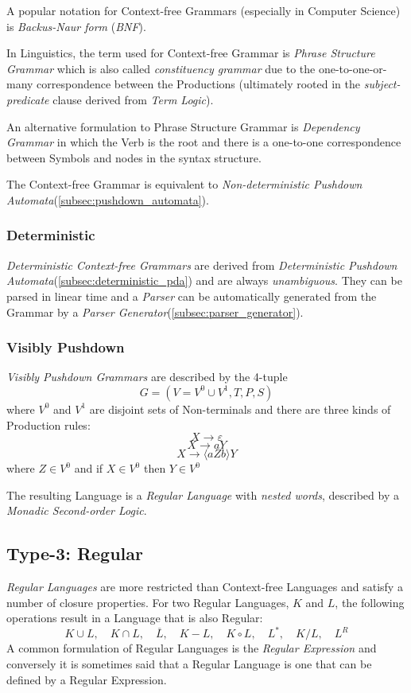 \documentclass{article}
\begin{document}
A popular notation for Context-free Grammars (especially in Computer
Science) is \emph{Backus-Naur form} (\emph{BNF}).

In Linguistics, the term used for Context-free Grammar is \emph{Phrase
  Structure Grammar} which is also called \emph{constituency grammar}
due to the one-to-one-or-many correspondence between the Productions
(ultimately rooted in the \emph{subject-predicate} clause derived from
\emph{Term Logic}).

An alternative formulation to Phrase Structure Grammar is \emph{Dependency
  Grammar} in which the Verb is the root and there is a one-to-one
correspondence between Symbols and nodes in the syntax structure.

The Context-free Grammar is equivalent to \emph{Non-deterministic
Pushdown Automata}(\ref{subsec:pushdown_automata}).

\subsubsection{Deterministic}\label{subsec:deterministic_cfg}
\emph{Deterministic Context-free Grammars} are derived from
\emph{Deterministic Pushdown Automata}(\ref{subsec:deterministic_pda})
and are always \emph{unambiguous}. They can be parsed in linear time
and a \emph{Parser} can be automatically generated from the Grammar by a
\emph{Parser Generator}(\ref{subsec:parser_generator}).

\subsubsection{Visibly Pushdown}
\emph{Visibly Pushdown Grammars} are described by the 4-tuple
\[
    G = (V=V^0 \cup V^1,T,P,S)
\]
where $V^0$ and $V^1$ are disjoint sets of Non-terminals and there
are three kinds of Production rules:
\[
    X \rightarrow \varepsilon
\]\[
    X \rightarrow aY
\]\[
    X \rightarrow \langle aZb \rangle Y
\]
where $Z \in V^0$ and if $X \in V^0$ then $Y \in V^0$

The resulting Language is a \emph{Regular Language} with \emph{nested
  words}, described by a \emph{Monadic Second-order Logic}. %

\subsection{Type-3: Regular} \label{subsec:regular_language}

\emph{Regular Languages} are more restricted than Context-free
Languages and satisfy a number of closure properties. For two Regular
Languages, $K$ and $L$, the following operations result in a Language
that is also Regular:
\[
    K \cup L, \quad
    K \cap L, \quad
    \overline{L}, \quad
    K - L, \quad
    K \circ L, \quad
    L^*, \quad
    K / L, \quad
    L^R
\]
A common formulation of Regular Languages is the \emph{Regular
  Expression} and conversely it is sometimes said that a Regular
Language is one that can be defined by a Regular Expression.
\end{document}
